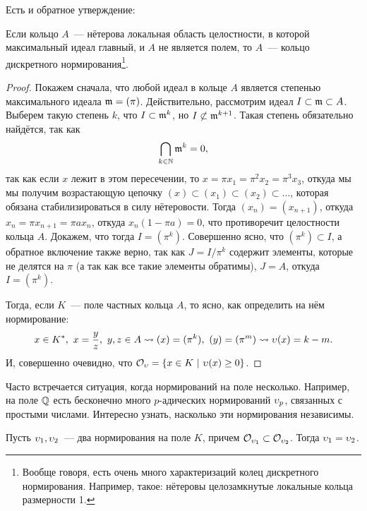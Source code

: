 	
	Есть и обратное утверждение: 
	\begin{statement}\label{ant_2_prop_1} 
		Если кольцо $A$~--- нётерова локальная область целостности, в которой максимальный идеал главный, и $A$ не является полем, то $A$~--- кольцо дискретного нормирования\footnote{Вообще говоря, есть очень много характеризаций колец дискретного нормирования. Например, такое: нётеровы целозамкнутые локальные кольца размерности 1. }. 	
	\end{statement}
	\begin{proof}
		Покажем сначала, что любой идеал в кольце $A$ является степенью максимального идеала $\mathfrak{m} = (\pi)$. Действительно, рассмотрим идеал $I \subset \mathfrak{m} \subset A$. Выберем такую степень $k$, что $I \subset \mathfrak{m}^{k}$, но $I \not\subset \mathfrak{m}^{k + 1}$. Такая степень обязательно найдётся, так как 
	\[
		\bigcap_{k \in \mathbb{N}} \mathfrak{m}^k = 0,
	\]
	так как если $x$ лежит в этом пересечении, то $x = \pi x_1 = \pi^2 x_2 = \pi^3 x_3$, откуда мы мы получим возрастающую цепочку $(x) \subset (x_1) \subset (x_2) \subset \ldots$, которая обязана стабилизироваться в силу нётеровости. Тогда  $(x_n) = (x_{n + 1})$, откуда $ x_n = \pi x_{n + 1} = \pi a x_{n}$, откуда $x_n (1 - \pi a) = 0$, что противоречит целостности кольца $A$. Докажем, что тогда $I = (\pi^k)$. Совершенно ясно, что $(\pi^k) \subset I$,  а обратное включение также верно, так как $J = I/\pi^k$ содержит элементы, которые не делятся на $\pi$ (а так как все такие элементы обратимы), $J = A$, откуда $I = (\pi^k)$.

	Тогда, если $K$~--- поле частных кольца $A$, то ясно, как определить на нём нормирование: 
	\[
		x \in K^{*}, \ x = \frac{y}{z}, \ y, z \in A \rightsquigarrow (x) = (\pi^k), \ (y) = (\pi^m) \rightsquigarrow \upsilon(x) = k - m.
	\]
	И, совершенно очевидно, что $\mathcal{O}_{\upsilon} = \{ x \in K \ \vert \ \upsilon(x) \ge 0 \}$. 
	\end{proof}

	Часто встречается ситуация, когда нормирований на поле несколько. Например, на поле $\mathbb{Q}$ есть бесконечно много $p$-адических нормирований $\upsilon_{p}$, связанных с простыми числами. Интересно узнать, насколько эти нормирования независимы. 

	\begin{lemma}\label{ant_2_lemma_1} 
		Пусть $\upsilon_1, \upsilon_2$~--- два нормирования на поле $K$, причем $\mathcal{O}_{\upsilon_1} \subset \mathcal{O}_{\upsilon_2}$. Тогда $\upsilon_1 = \upsilon_2$.
	\end{lemma}

